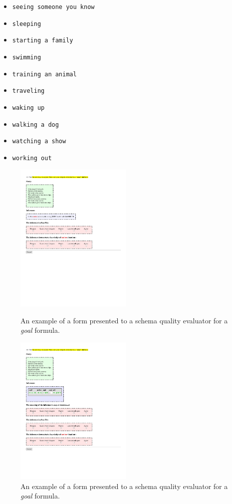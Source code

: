 {{\begin{multicols}{3}
\begin{itemize}
\item \texttt{seeing someone you know}
\item \texttt{sleeping}
\item \texttt{starting a family}
\item \texttt{swimming}
\item \texttt{training an animal}
\item \texttt{traveling}
\item \texttt{waking up}
\item \texttt{walking a dog}
\item \texttt{watching a show}
\item \texttt{working out}
\end{itemize}
\end{multicols}
}
}

\begin{figure}
    \centering
    \includegraphics[width=0.5\textwidth]{CH5_eval/role_inf.pdf}
    \caption{An example of a form presented to a schema quality evaluator for a \textit{goal} formula.}
    \label{fig:role_inf_eval}
        \includegraphics[width=0.5\textwidth]{CH5_eval/step_inf.pdf}
    \caption{An example of a form presented to a schema quality evaluator for a \textit{goal} formula.}
    \label{fig:step_inf_eval}
\end{figure}

